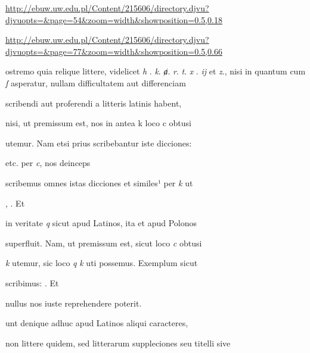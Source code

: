 
\newParkoszpage

{
\url{http://ebuw.uw.edu.pl/Content/215606/directory.djvu?djvuopts=&page=54&zoom=width&showposition=0.5,0.18}

\url{http://ebuw.uw.edu.pl/Content/215606/directory.djvu?djvuopts=&page=77&zoom=width&showposition=0.5,0.66}
}

\bigskip

\obeylines
\mono



\fullpreviouslines


{
\color{blue}

\indentP {}ostremo quia relique littere, videlicet
\textit{h} . \textit{k}. \textit{ⱥ}. \textit{r}. \textit{t}. \textit{x} . \textit{ij} et \textit{z}., nisi in quantum cum
\textit{ſ} asperatur, nullam difficultatem aut  differenciam

scribendi aut proferendi a litteris latinis habent,
}


\fulllines

nisi, ut premissum est, nos in antea k loco c obtusi

utemur. Nam etsi prius scribebantur iste dicciones:  

    etc. per \textit{c}, nos deinceps

scribemus omnes istas dicciones et similes¹ per \textit{k} ut 

 ,    . Et

in veritate \textit{q} sicut apud Latinos, ita et apud Polonos

superfluit. Nam, ut premissum est, sicut loco \textit{c} obtusi

\textit{k} utemur, sic loco \textit{q} \textit{k} uti possemus. Exemplum sicut

scribimus:     . Et

nullus nos iuste reprehendere poterit.

unt denique adhuc apud Latinos aliqui caracteres,

non littere quidem, sed litterarum suppleciones seu titelli sive

